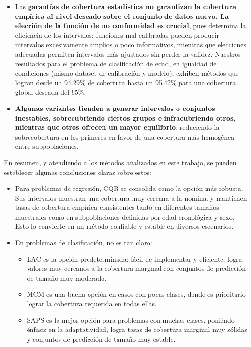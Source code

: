 \begin{itemize}

    \item Las \textbf{garantías de cobertura estadística no garantizan la cobertura empírica al nivel deseado sobre el conjunto de datos nuevo. La elección de la función de no conformidad es crucial}, pues determina la eficiencia de los intervalos: funciones mal calibradas pueden producir intervalos excesivamente amplios o poco informativos, mientras que elecciones adecuadas permiten intervalos más ajustados sin perder la validez. Nuestros resultados para el problema de clasificación de edad, en igualdad de condiciones (mismo dataset de calibración y modelo), exhiben métodos que logran desde un 94.29\% de cobertura hasta un 95.42\% para una cobertura global deseada del 95\%. 
    
    \item \textbf{Algunas variantes tienden a generar intervalos o conjuntos inestables, sobrecubriendo ciertos grupos e infracubriendo otros, mientras que otros ofrecen un mayor equilibrio}, reduciendo la sobrecobertura en los primeros en favor de una cobertura más homogénea entre subpoblaciones.
     
\end{itemize}

En resumen, y atendiendo a los métodos analizados en este trabajo, se pueden establecer algunas conclusiones claras sobre estos:

\begin{itemize}
    
    \item Para problemas de regresión, CQR se consolida como la opción más robusta. Sus intervalos muestran una cobertura muy cercana a la nominal y mantienen tasas de cobertura empírica consistentes tanto en diferentes tamaños muestrales como en subpoblaciones definidas por edad cronológica y sexo. Esto lo convierte en un método confiable y estable en diversos escenarios.
    
    \item En problemas de clasificación, no es tan claro:
    \begin{itemize}
        \item LAC es la opción predeterminada: fácil de implementar y eficiente, logra valores muy cercanos a la cobertura marginal con conjuntos de predicción de tamaño muy moderado.
        \item MCM es una buena opción en casos con pocas clases, donde es prioritario lograr la cobertura requerida en todas ellas.
        \item SAPS es la mejor opción para problemas con muchas clases, poniéndo énfasis en la adaptatividad, logra tasas de cobertura marginal muy sólidas y conjuntos de predicción de tamaño muy estable. 
    \end{itemize}

\end{itemize}

